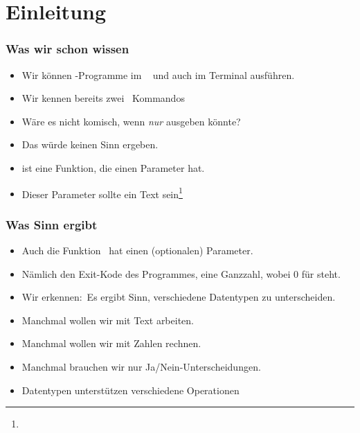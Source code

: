 \documentclass[aspectratio=169,mathserif,notheorems]{beamer}%
\subtitle{7.~Der Datentyp int}%
\begin{document}
%
%
\startPresentation%
%
\section{Einleitung}%
%
\begin{frame}%
\frametitle{Was wir schon wissen}%
\begin{itemize}%
\item Wir können \python-Programme im \pycharm\  und auch im Terminal ausführen.%
\item<2-> Wir kennen bereits zwei \python\ Kommandos%
\item<5-> Wäre es nicht komisch, wenn  \emph{nur}  ausgeben könnte?%
\item<6-> Das würde keinen Sinn ergeben.%
\item<7->  ist eine Funktion, die einen Parameter hat.%
\item<8-> Dieser Parameter sollte ein Text sein\footnote<8->{}%
\end{itemize}%
\end{frame}%
%
\begin{frame}%
\frametitle{Was Sinn ergibt}%
\begin{itemize}%
\item Auch die Funktion~ hat einen (optionalen) Parameter.%
\item<2-> Nämlich den Exit-Kode des Programmes, eine Ganzzahl, wobei 0 für  steht.\medskip%
\item<3-> Wir erkennen:~Es ergibt Sinn, verschiedene Datentypen zu unterscheiden.%
\item<4-> Manchmal wollen wir mit Text arbeiten.%
\item<5-> Manchmal wollen wir mit Zahlen rechnen.%
\item<6-> Manchmal brauchen wir nur Ja/Nein-Unterscheidungen.%
\item<7-> Datentypen unterstützen verschiedene Operationen%
\end{itemize}%
\end{frame}%
\end{document}
